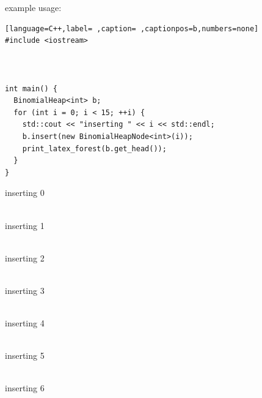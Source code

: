 \documentclass[a4paper,12pt]{article}
\begin{document}
example usage:\\[0pt]

\begin{lstlisting}[language=C++,label= ,caption= ,captionpos=b,numbers=none]
#include <iostream>



int main() {
  BinomialHeap<int> b;
  for (int i = 0; i < 15; ++i) {
    std::cout << "inserting " << i << std::endl;
    b.insert(new BinomialHeapNode<int>(i));
    print_latex_forest(b.get_head());
  }
}
\end{lstlisting}

inserting 0\\[0pt]
\begin{center}

\end{center}\\[0pt]

inserting 1\\[0pt]
\begin{center}

\end{center}\\[0pt]

inserting 2\\[0pt]
\begin{center}

\end{center}\\[0pt]

inserting 3\\[0pt]
\begin{center}

\end{center}\\[0pt]

inserting 4\\[0pt]
\begin{center}

\end{center}\\[0pt]

inserting 5\\[0pt]
\begin{center}

\end{center}\\[0pt]

inserting 6\\[0pt]
\begin{center}

\end{center}\\[0pt]
\end{document}
